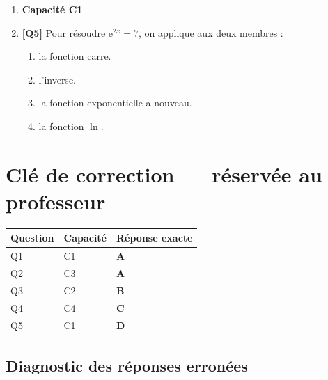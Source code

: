 \begin{enumerate}
\item[] \textbf{Capacité C1}

\item \textbf{[Q5]} Pour résoudre $\mathrm{e}^{2x} = 7$, on applique aux deux membres :
  \begin{enumerate}[label=\Alph*.]
    \item la fonction carre.
    \item l'inverse.
    \item la fonction exponentielle a nouveau.
    \item la fonction $\ln$.
  \end{enumerate}

\end{enumerate}

\ifnxVersionProfesseur
\clearpage
\section*{Clé de correction — réservée au professeur}

\begin{center}
\begin{tabular}{lll}
\hline
Question & Capacité & Réponse exacte \\
\hline
Q1 & C1 & \textbf{A} \\
Q2 & C3 & \textbf{A} \\
Q3 & C2 & \textbf{B} \\
Q4 & C4 & \textbf{C} \\
Q5 & C1 & \textbf{D} \\
\hline
\end{tabular}
\end{center}

\subsection*{Diagnostic des réponses erronées}

